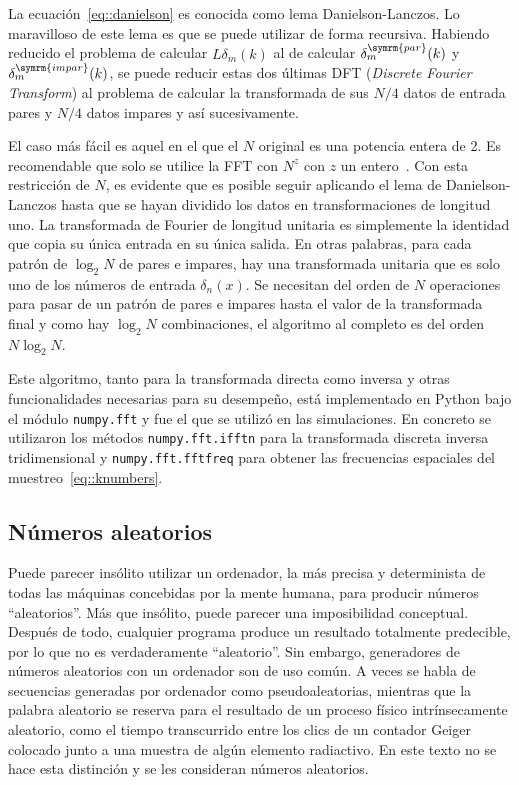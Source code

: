La ecuación~\eqref{eq::danielson} es conocida como lema Danielson-Lanczos. Lo maravilloso de este lema es que se puede utilizar de forma recursiva. Habiendo reducido el problema de calcular \(L\delta_m(k)\) al de calcular \(\delta_m^{\symrm{par}}(k)\) y \(\delta_m^{\symrm{impar}}(k)\), se puede reducir estas dos últimas DFT (\textit{Discrete Fourier Transform}) al problema de calcular la transformada de sus \(N/4\) datos de entrada pares y \(N/4\) datos impares y así sucesivamente.

El caso más fácil es aquel en el que el \(N\) original es una potencia entera de 2. Es recomendable que solo se utilice la FFT con \(N^z\) con \(z\) un entero~\cite{press2007numerical}. Con esta restricción de \(N\), es evidente que es posible seguir aplicando el lema de Danielson-Lanczos hasta que se hayan dividido los datos en transformaciones de longitud uno. La transformada de Fourier de longitud unitaria es simplemente la identidad que copia su única entrada en su única salida. En otras palabras, para cada patrón de \(\log_2N\) de pares e impares, hay una transformada unitaria que es solo uno de los números de entrada \(\delta_n(x)\). Se necesitan del orden de \(N\) operaciones para pasar de un patrón de pares e impares hasta el valor de la transformada final y como hay \(\log_2N\) combinaciones, el algoritmo al completo es del orden \(N\log_2N\).

Este algoritmo, tanto para la transformada directa como inversa y otras funcionalidades necesarias para su desempeño, está implementado en Python bajo el módulo \texttt{numpy.fft} y fue el que se utilizó en las simulaciones. En concreto se utilizaron los métodos \texttt{numpy.fft.ifftn} para la transformada discreta inversa tridimensional y \texttt{numpy.fft.fftfreq} para obtener las frecuencias espaciales del muestreo~\eqref{eq::knumbers}.
\subsection{Números aleatorios}
Puede parecer insólito utilizar un ordenador, la más precisa y determinista de todas las máquinas concebidas por la mente humana, para producir números ``aleatorios''. Más que insólito, puede parecer una imposibilidad conceptual. Después de todo, cualquier programa produce un resultado totalmente predecible, por lo que no es verdaderamente ``aleatorio''. Sin embargo, generadores de números aleatorios con un ordenador son de uso común. A veces se habla de secuencias generadas por ordenador como pseudoaleatorias, mientras que la palabra aleatorio se reserva para el resultado de un proceso físico intrínsecamente aleatorio, como el tiempo transcurrido entre los clics de un contador Geiger colocado junto a una muestra de algún elemento radiactivo. En este texto no se hace esta distinción y se les consideran números aleatorios.

